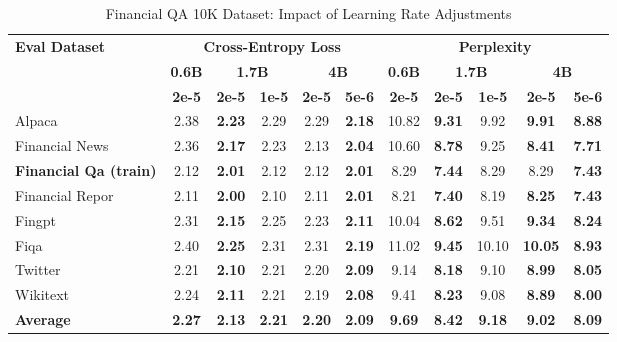 
\begin{table}[h]
\centering
\caption[Financial QA 10K: Learning Rate Comparison]{Financial QA 10K Dataset: Impact of Learning Rate Adjustments}
\label{tab:financial_qa_lr_comparison}
\begin{tabular}{l|c|cc|cc|c|cc|cc}
\hline
\multirow{3}{*}{\textbf{Eval Dataset}} &
\multicolumn{5}{c|}{\textbf{Cross-Entropy Loss}} &
\multicolumn{5}{c}{\textbf{Perplexity}} \\
\cline{2-6} \cline{7-11}
& \textbf{0.6B} & \multicolumn{2}{c|}{\textbf{1.7B}} & \multicolumn{2}{c|}{\textbf{4B}} &
 \textbf{0.6B} & \multicolumn{2}{c|}{\textbf{1.7B}} & \multicolumn{2}{c}{\textbf{4B}} \\
\cline{3-4} \cline{5-6} \cline{8-9} \cline{10-11}
& \textbf{2e-5} & \textbf{2e-5} & \textbf{1e-5} & \textbf{2e-5} & \textbf{5e-6} &
 \textbf{2e-5} & \textbf{2e-5} & \textbf{1e-5} & \textbf{2e-5} & \textbf{5e-6} \\
\hline
 Alpaca & 2.38 & \textbf{2.23} & 2.29 & 2.29 & \textbf{2.18} & 10.82 & \textbf{9.31} & 9.92 & \textbf{9.91} & \textbf{8.88} \\
Financial News & 2.36 & \textbf{2.17} & 2.23 & 2.13 & \textbf{2.04} & 10.60 & \textbf{8.78} & 9.25 & \textbf{8.41} & \textbf{7.71} \\
\rowcolor{gray!20} \textbf{Financial Qa (train)} & 2.12 & \textbf{2.01} & 2.12 & 2.12 & \textbf{2.01} & 8.29 & \textbf{7.44} & 8.29 & 8.29 & \textbf{7.43} \\
Financial Repor & 2.11 & \textbf{2.00} & 2.10 & 2.11 & \textbf{2.01} & 8.21 & \textbf{7.40} & 8.19 & \textbf{8.25} & \textbf{7.43} \\
Fingpt & 2.31 & \textbf{2.15} & 2.25 & 2.23 & \textbf{2.11} & 10.04 & \textbf{8.62} & 9.51 & \textbf{9.34} & \textbf{8.24} \\
Fiqa & 2.40 & \textbf{2.25} & 2.31 & 2.31 & \textbf{2.19} & 11.02 & \textbf{9.45} & 10.10 & \textbf{10.05} & \textbf{8.93} \\
Twitter & 2.21 & \textbf{2.10} & 2.21 & 2.20 & \textbf{2.09} & 9.14 & \textbf{8.18} & 9.10 & \textbf{8.99} & \textbf{8.05} \\
Wikitext & 2.24 & \textbf{2.11} & 2.21 & 2.19 & \textbf{2.08} & 9.41 & \textbf{8.23} & 9.08 & \textbf{8.89} & \textbf{8.00} \\
\rowcolor{blue!10} \textbf{Average} & \textbf{2.27} & \textbf{2.13} & \textbf{2.21} & \textbf{2.20} & \textbf{2.09} & \textbf{9.69} & \textbf{8.42} & \textbf{9.18} & \textbf{9.02} & \textbf{8.09}  \\
\hline
\end{tabular}
\end{table}

